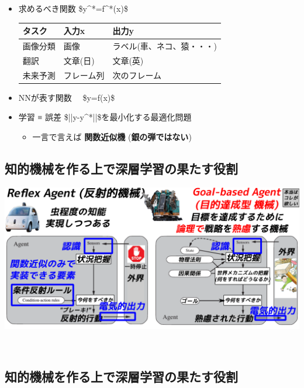 \begin{itemize}
\item 求めるべき関数 \$y\^{}*=f\^{}*(x)\$

\begin{center}
\begin{tabular}{lll}
タスク & 入力x & 出力y\\
\hline
画像分類 & 画像 & ラベル(車、ネコ、猿・・・)\\
翻訳 & 文章(日) & 文章(英)\\
未来予測 & フレーム列 & 次のフレーム\\
\end{tabular}
\end{center}

\item NNが表す関数　 \$y=f(x)\$

\item 学習 ≡ 誤差 \$||y-y\^{}*||\$を最小化する最適化問題

\begin{itemize}
\item 一言で言えば \textbf{関数近似機} (\textbf{銀の弾ではない})
\end{itemize}
\end{itemize}

\subsection{知的機械を作る上で深層学習の果たす役割}
\label{sec:orgheadline31}

\includegraphics{img/machines/3.png}

　

\subsection{知的機械を作る上で深層学習の果たす役割}
\label{sec:orgheadline32}

